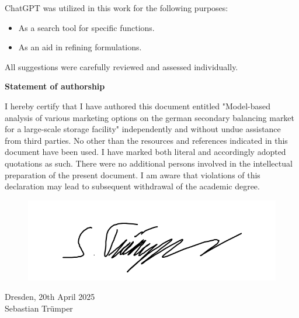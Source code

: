 ChatGPT was utilized in this work for the following purposes:
\begin{itemize}
	\item As a search tool for specific functions.
	\item As an aid in refining formulations.
\end{itemize}
All suggestions were carefully reviewed and assessed individually.



\begin{center}
	\textbf{Statement of authorship}
\end{center}

I hereby certify that I have authored this document entitled "Model-based analysis of various
marketing options on the german secondary balancing market for a large-scale storage facility" independently
and without undue assistance from third parties. No other than the resources and references
indicated in this document have been used. I have marked both literal and accordingly adopted
quotations as such. There were no additional persons involved in the intellectual preparation
of the present document. I am aware that violations of this declaration may lead to subsequent
withdrawal of the academic degree.\\

\begin{figure}[!h]
	\includegraphics[width=0.5\linewidth]{figures/unterschrift.png}
\end{figure}
Dresden, 20th April 2025\\
Sebastian Trümper\\